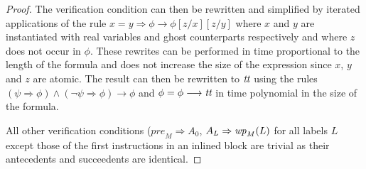 \documentclass[10pt,twocolumn]{article}
\newcommand{\Pre}{\mathit{pre}}
\newcommand{\AND}{\wedge}
\newcommand{\WP}{{\it wp}}
\newcommand{\True}{\mbox{\it tt}}
\begin{document}
\begin{proof}
The verification condition can then be rewritten and simplified by 
iterated applications of the rule $x = y \Rightarrow \phi \longrightarrow \phi[z/x][z/y]$ where $x$ and $y$ are instantiated with real variables and ghost counterparts respectively and where $z$ does not occur in $\phi$. 
These rewrites can be performed in time proportional to the
length of the formula and does not increase the 
size of the expression since $x$, $y$ and $z$ are atomic. The result can then be rewritten to $\True$ using the rules $(\psi \Rightarrow \phi) \AND (\neg\psi \Rightarrow \phi) \longrightarrow \phi$ and $\phi = \phi \longrightarrow \True$ in time polynomial in the size of the formula.

All other verification conditions ($\Pre_M \Rightarrow A_0$, $A_L \Rightarrow \WP_M(L)$ for all labels $L$ except those of the first instructions in an inlined block are trivial as their antecedents and succeedents are identical.
\end{proof}
\end{document}
